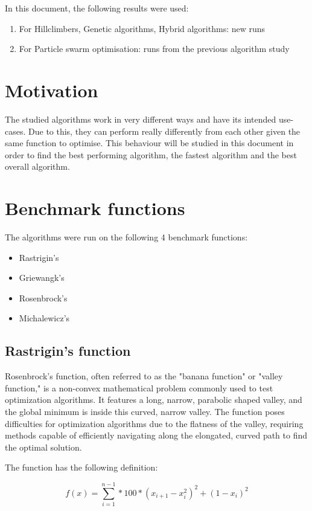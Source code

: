 \documentclass[conference]{IEEEtran}
\begin{document}
In this document, the following results were used:

\begin{enumerate}
    \item For Hillclimbers, Genetic algorithms, Hybrid algorithms: new runs
    \item For Particle swarm optimisation: runs from the previous algorithm study
\end{enumerate}

\section{Motivation}
The studied algorithms work in very different ways and have its intended use-cases. Due to this, they can perform really
differently from each other given the same function to optimise. This behaviour will be studied in this document in order to
find the best performing algorithm, the fastest algorithm and the best overall algorithm.

\section{Benchmark functions}
The algorithms were run on the following 4 benchmark functions:

\begin{itemize}
    \item Rastrigin's
    \item Griewangk's
    \item Rosenbrock's
    \item Michalewicz's
\end{itemize}

\subsection{Rastrigin's function}
Rosenbrock's function, often referred to as the "banana function" or "valley function," is a non-convex mathematical problem
commonly used to test optimization algorithms. It features a long, narrow, parabolic shaped valley, and the global minimum
is inside this curved, narrow valley. The function poses difficulties for optimization algorithms due to the flatness of the valley,
requiring methods capable of efficiently navigating along the elongated, curved path to find the optimal solution.

The function has the following definition:

\begin{equation}
    f(x) = \sum_{i=1}^{n-1} * 100 * (x_{i+1} - x_i^2)^2 + (1 - x_i)^2
\end{equation}
\end{document}
